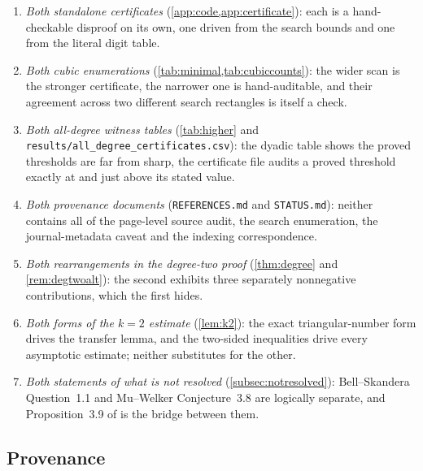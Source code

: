 \documentclass[11pt,letterpaper]{article}
\numberwithin{equation}{section}
\theoremstyle{definition}
\theoremstyle{remark}
\begin{document}
\begin{enumerate}[label=P\arabic*.,leftmargin=3.2em]
 algebra systems confirming the same integers is worth more than either alone.
\item\label{pair:cert}
 \emph{Both standalone certificates} (\cref{app:code,app:certificate}): each is
 a hand-checkable disproof on its own, one driven from the search bounds and
 one from the literal digit table.
\item\label{pair:scan}
 \emph{Both cubic enumerations} (\cref{tab:minimal,tab:cubiccounts}): the wider
 scan is the stronger certificate, the narrower one is hand-auditable, and
 their agreement across two different search rectangles is itself a check.
\item\label{pair:tables}
 \emph{Both all-degree witness tables} (\cref{tab:higher} and
 \texttt{results/all\_degree\_certificates.csv}): the dyadic table shows the
 proved thresholds are far from sharp, the certificate file audits a proved
 threshold exactly at and just above its stated value.
\item\label{pair:prov}
 \emph{Both provenance documents} (\texttt{REFERENCES.md} and
 \texttt{STATUS.md}): neither contains all of the page-level source audit, the
 search enumeration, the journal-metadata caveat and the indexing
 correspondence.
\item\label{pair:degtwo}
 \emph{Both rearrangements in the degree-two proof} (\cref{thm:degree} and
 \cref{rem:degtwoalt}): the second exhibits three separately nonnegative
 contributions, which the first hides.
\item\label{pair:k2}
 \emph{Both forms of the $k=2$ estimate} (\cref{lem:k2}): the exact
 triangular-number form drives the transfer lemma, and the two-sided
 inequalities drive every asymptotic estimate; neither substitutes for the
 other.
\item\label{pair:open}
 \emph{Both statements of what is not resolved}
 (\cref{subsec:notresolved}): Bell--Skandera Question~1.1 and Mu--Welker
 Conjecture~3.8 are logically separate, and Proposition~3.9 of \cite{MW} is
 the bridge between them.
\end{enumerate}

\subsection{Provenance}\label{subsec:provenance}
\end{document}
